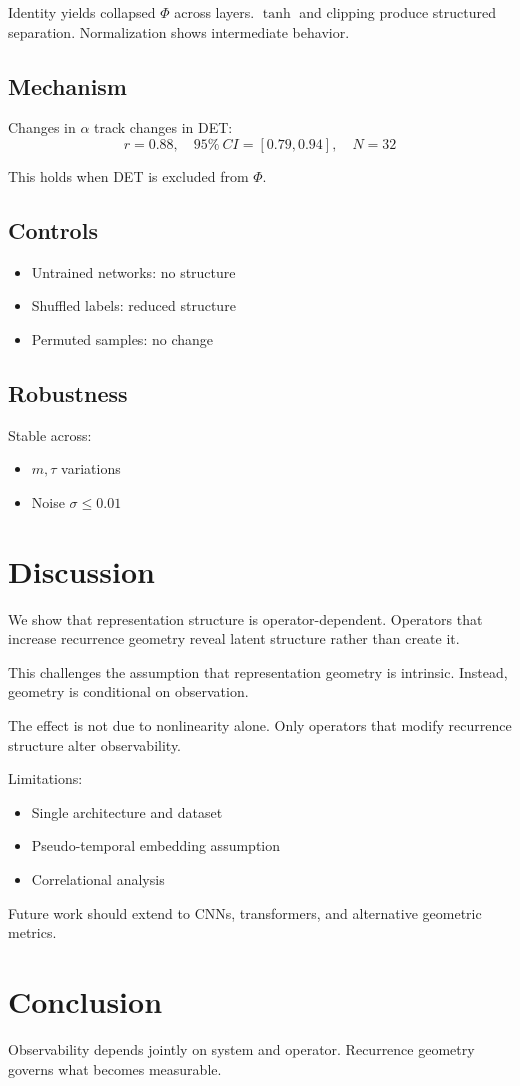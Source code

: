 \documentclass[11pt]{article}
\begin{document}
Identity yields collapsed $\Phi$ across layers. $\tanh$ and clipping produce structured separation. Normalization shows intermediate behavior.

\subsection{Mechanism}

Changes in $\alpha$ track changes in DET:
\[
	r = 0.88,\quad 95\%~CI=[0.79,0.94],\quad N=32
\]

This holds when DET is excluded from $\Phi$.

\subsection{Controls}

\begin{itemize}
	\item Untrained networks: no structure
	\item Shuffled labels: reduced structure
	\item Permuted samples: no change
\end{itemize}

\subsection{Robustness}

Stable across:
\begin{itemize}
	\item $m,\tau$ variations
	\item Noise $\sigma \le 0.01$
\end{itemize}

\section{Discussion}

We show that representation structure is operator-dependent. Operators that increase recurrence geometry reveal latent structure rather than create it.

This challenges the assumption that representation geometry is intrinsic. Instead, geometry is conditional on observation.

The effect is not due to nonlinearity alone. Only operators that modify recurrence structure alter observability.

Limitations:
\begin{itemize}
	\item Single architecture and dataset
	\item Pseudo-temporal embedding assumption
	\item Correlational analysis
\end{itemize}

Future work should extend to CNNs, transformers, and alternative geometric metrics.

\section{Conclusion}

Observability depends jointly on system and operator. Recurrence geometry governs what becomes measurable.
\end{document}
